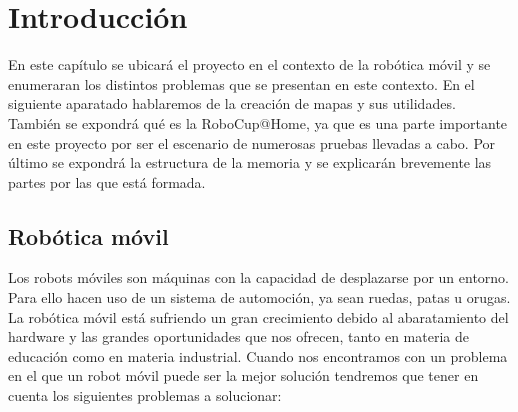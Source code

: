 \chapter{Introducción}
\label{cap:introduccion}
En este capítulo se ubicará el proyecto en el contexto de la robótica móvil y se enumeraran los distintos problemas que se presentan en este contexto. En el siguiente aparatado hablaremos de la creación de mapas y sus utilidades. También se expondrá qué es la RoboCup@Home, ya que es una parte importante en este proyecto por ser el escenario de numerosas pruebas llevadas a cabo. Por último se expondrá la estructura de la memoria y se explicarán brevemente las partes por las que está formada.

\section{Robótica móvil}
\label{cap:roboticamovil}
Los robots móviles son máquinas con la capacidad de desplazarse por un entorno. Para ello hacen uso de un sistema de automoción, ya sean ruedas, patas u orugas. 
La robótica móvil está sufriendo un gran crecimiento debido al abaratamiento del hardware y las grandes oportunidades que nos ofrecen, tanto en materia de educación como en materia industrial. 
Cuando nos encontramos con un problema en el que un robot móvil puede ser la mejor solución tendremos que tener en cuenta los siguientes problemas a solucionar:
